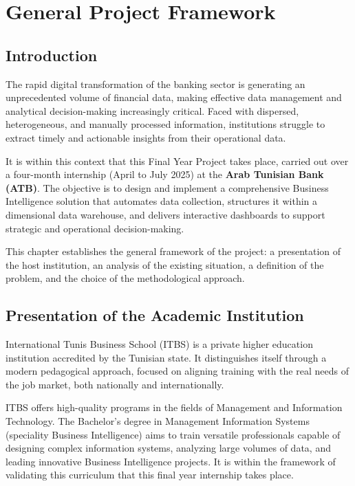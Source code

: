 \chapter{General Project Framework}

\section{Introduction}

The rapid digital transformation of the banking sector is generating an unprecedented volume of
financial data, making effective data management and analytical decision-making increasingly
critical. Faced with dispersed, heterogeneous, and manually processed information, institutions
struggle to extract timely and actionable insights from their operational data.

It is within this context that this Final Year Project takes place, carried out over a
four-month internship (April to July 2025) at the \textbf{Arab Tunisian Bank (ATB)}. The
objective is to design and implement a comprehensive Business Intelligence solution that
automates data collection, structures it within a dimensional data warehouse, and delivers
interactive dashboards to support strategic and operational decision-making.

This chapter establishes the general framework of the project: a presentation of the host
institution, an analysis of the existing situation, a definition of the problem, and the
choice of the methodological approach.

\section{Presentation of the Academic Institution}

International Tunis Business School (ITBS) is a private higher education institution
accredited by the Tunisian state. It distinguishes itself through a modern pedagogical
approach, focused on aligning training with the real needs of the job market, both nationally
and internationally.

ITBS offers high-quality programs in the fields of Management and Information Technology.
The Bachelor's degree in Management Information Systems (speciality Business Intelligence)
aims to train versatile professionals capable of designing complex information systems,
analyzing large volumes of data, and leading innovative Business Intelligence projects. It is
within the framework of validating this curriculum that this final year internship takes place.

